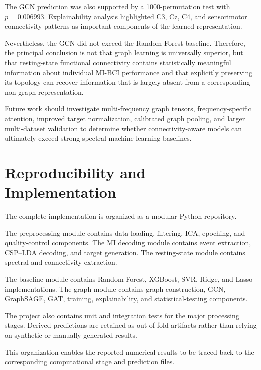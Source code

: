 \documentclass[conference]{IEEEtran}
\begin{document}
The GCN prediction was also supported by a 1000-permutation test with $p = 0.006993$. Explainability analysis highlighted C3, Cz, C4, and sensorimotor connectivity patterns as important components of the learned representation.

Nevertheless, the GCN did not exceed the Random Forest baseline. Therefore, the principal conclusion is not that graph learning is universally superior, but that resting-state functional connectivity contains statistically meaningful information about individual MI-BCI performance and that explicitly preserving its topology can recover information that is largely absent from a corresponding non-graph representation.

Future work should investigate multi-frequency graph tensors, frequency-specific attention, improved target normalization, calibrated graph pooling, and larger multi-dataset validation to determine whether connectivity-aware models can ultimately exceed strong spectral machine-learning baselines.

\section{Reproducibility and Implementation}
The complete implementation is organized as a modular Python repository.

The preprocessing module contains data loading, filtering, ICA, epoching, and quality-control components. The MI decoding module contains event extraction, CSP--LDA decoding, and target generation. The resting-state module contains spectral and connectivity extraction.

The baseline module contains Random Forest, XGBoost, SVR, Ridge, and Lasso implementations. The graph module contains graph construction, GCN, GraphSAGE, GAT, training, explainability, and statistical-testing components.

The project also contains unit and integration tests for the major processing stages. Derived predictions are retained as out-of-fold artifacts rather than relying on synthetic or manually generated results.

This organization enables the reported numerical results to be traced back to the corresponding computational stage and prediction files.
\end{document}
